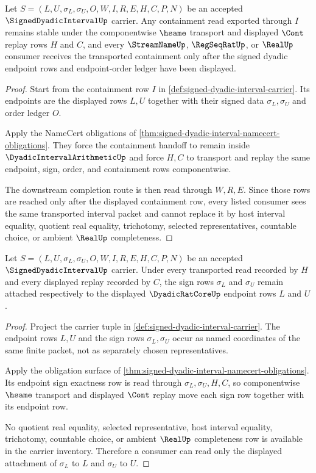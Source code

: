 \begin{theorem}
\label{thm:signed-dyadic-interval-containment-stability}
Let $S=(L,U,\sigma_L,\sigma_U,O,W,I,R,E,H,C,P,N)$ be an accepted $\SignedDyadicIntervalUp$ carrier. Any containment read exported through $I$ remains stable under the componentwise $\hsame$ transport and displayed $\Cont$ replay rows $H$ and $C$, and every $\StreamNameUp$, $\RegSeqRatUp$, or $\RealUp$ consumer receives the transported containment only after the signed dyadic endpoint rows and endpoint-order ledger have been displayed.
\end{theorem}
\begin{proof}
Start from the containment row $I$ in \autoref{def:signed-dyadic-interval-carrier}. Its endpoints are the displayed rows $L,U$ together with their signed data $\sigma_L,\sigma_U$ and order ledger $O$.

Apply the NameCert obligations of \autoref{thm:signed-dyadic-interval-namecert-obligations}. They force the containment handoff to remain inside $\DyadicIntervalArithmeticUp$ and force $H,C$ to transport and replay the same endpoint, sign, order, and containment rows componentwise.

The downstream completion route is then read through $W,R,E$. Since those rows are reached only after the displayed containment row, every listed consumer sees the same transported interval packet and cannot replace it by host interval equality, quotient real equality, trichotomy, selected representatives, countable choice, or ambient $\RealUp$ completeness.
\end{proof}

\begin{theorem}
\label{thm:signed-dyadic-interval-endpoint-sign-exactness}
Let $S=(L,U,\sigma_L,\sigma_U,O,W,I,R,E,H,C,P,N)$ be an accepted $\SignedDyadicIntervalUp$ carrier. Under every transported read recorded by $H$ and every displayed replay recorded by $C$, the sign rows $\sigma_L$ and $\sigma_U$ remain attached respectively to the displayed $\DyadicRatCoreUp$ endpoint rows $L$ and $U$.
\end{theorem}
\begin{proof}
Project the carrier tuple in \autoref{def:signed-dyadic-interval-carrier}. The endpoint rows $L,U$ and the sign rows $\sigma_L,\sigma_U$ occur as named coordinates of the same finite packet, not as separately chosen representatives.

Apply the obligation surface of \autoref{thm:signed-dyadic-interval-namecert-obligations}. Its endpoint sign exactness row is read through $\sigma_L,\sigma_U,H,C$, so componentwise $\hsame$ transport and displayed $\Cont$ replay move each sign row together with its endpoint row.

No quotient real equality, selected representative, host interval equality, trichotomy, countable choice, or ambient $\RealUp$ completeness row is available in the carrier inventory. Therefore a consumer can read only the displayed attachment of $\sigma_L$ to $L$ and $\sigma_U$ to $U$.
\end{proof}

